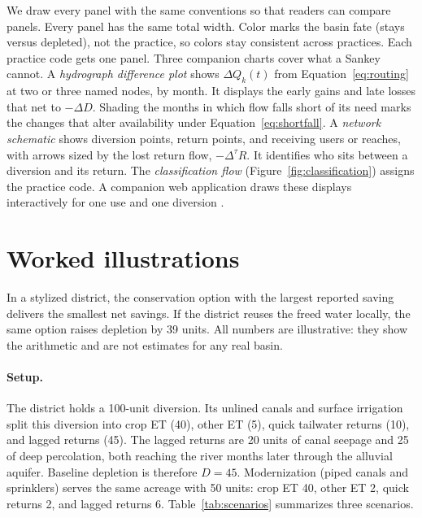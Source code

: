 \documentclass[11pt]{article}
\newcommand{\dtau}{\Delta^{\tau}}            %
\begin{document}
We draw every panel with the same conventions so that readers can compare panels. Every panel has the same total width. Color marks the basin fate (stays versus depleted), not the practice, so colors stay consistent across practices. Each practice code gets one panel. Three companion charts cover what a Sankey cannot. A \emph{hydrograph difference plot} shows $\Delta Q_k(t)$ from Equation~\eqref{eq:routing} at two or three named nodes, by month. It displays the early gains and late losses that net to $-\Delta D$. Shading the months in which flow falls short of its need marks the changes that alter availability under Equation~\eqref{eq:shortfall}. A \emph{network schematic} shows diversion points, return points, and receiving users or reaches, with arrows sized by the lost return flow, $-\dtau R$. It identifies who sits between a diversion and its return. The \emph{classification flow} (Figure~\ref{fig:classification}) assigns the practice code. A companion web application draws these displays interactively for one use and one diversion \citep{yoder2026ledger}.

\section{Worked illustrations}\label{sec:examples}

In a stylized district, the conservation option with the largest reported saving delivers the smallest net savings. If the district reuses the freed water locally, the same option raises depletion by 39 units. All numbers are illustrative: they show the arithmetic and are not estimates for any real basin.

\paragraph{Setup.} The district holds a 100-unit diversion. Its unlined canals and surface irrigation split this diversion into crop ET (40), other ET (5), quick tailwater returns (10), and lagged returns (45). The lagged returns are 20 units of canal seepage and 25 of deep percolation, both reaching the river months later through the alluvial aquifer. Baseline depletion is therefore $D = 45$. Modernization (piped canals and sprinklers) serves the same acreage with 50 units: crop ET 40, other ET 2, quick returns 2, and lagged returns 6. Table~\ref{tab:scenarios} summarizes three scenarios.
\end{document}
